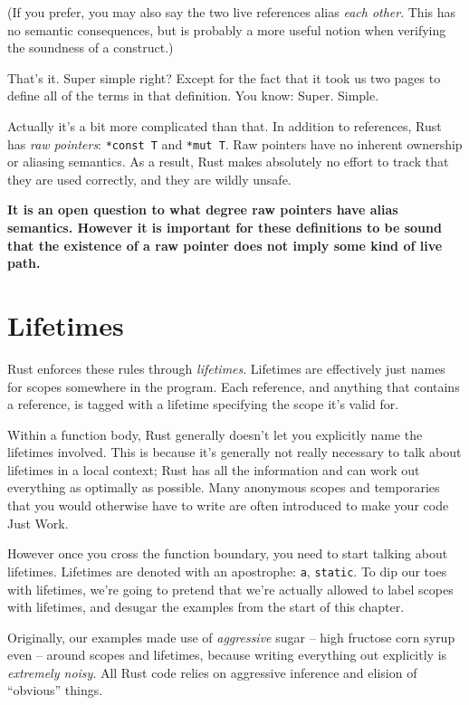 \documentclass[a4paper,]{book}
\begin{document}
(If you prefer, you may also say the two live references alias
\emph{each other}. This has no semantic consequences, but is probably a
more useful notion when verifying the soundness of a construct.)

That's it. Super simple right? Except for the fact that it took us two
pages to define all of the terms in that definition. You know: Super.
Simple.

Actually it's a bit more complicated than that. In addition to
references, Rust has \emph{raw pointers}: \texttt{*const\ T} and
\texttt{*mut\ T}. Raw pointers have no inherent ownership or aliasing
semantics. As a result, Rust makes absolutely no effort to track that
they are used correctly, and they are wildly unsafe.

\textbf{It is an open question to what degree raw pointers have alias
semantics. However it is important for these definitions to be sound
that the existence of a raw pointer does not imply some kind of live
path.}

\section{Lifetimes}\label{sec--lifetimes}

Rust enforces these rules through \emph{lifetimes}. Lifetimes are
effectively just names for scopes somewhere in the program. Each
reference, and anything that contains a reference, is tagged with a
lifetime specifying the scope it's valid for.

Within a function body, Rust generally doesn't let you explicitly name
the lifetimes involved. This is because it's generally not really
necessary to talk about lifetimes in a local context; Rust has all the
information and can work out everything as optimally as possible. Many
anonymous scopes and temporaries that you would otherwise have to write
are often introduced to make your code Just Work.

However once you cross the function boundary, you need to start talking
about lifetimes. Lifetimes are denoted with an apostrophe:
\texttt{\textquotesingle{}a}, \texttt{\textquotesingle{}static}. To dip
our toes with lifetimes, we're going to pretend that we're actually
allowed to label scopes with lifetimes, and desugar the examples from
the start of this chapter.

Originally, our examples made use of \emph{aggressive} sugar -- high
fructose corn syrup even -- around scopes and lifetimes, because writing
everything out explicitly is \emph{extremely noisy}. All Rust code
relies on aggressive inference and elision of ``obvious'' things.
\end{document}

